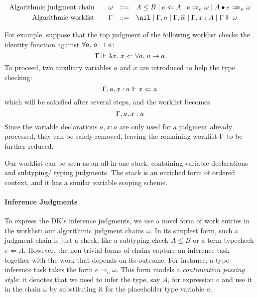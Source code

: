 $$\begin{aligned}
\text{Algorithmic judgment chain}\qquad&\jg &::=&\quad A \le B \mid e\Lto A \mid e\To_{a} \jg \mid \appInfAlg{A}{e}\\
\text{Algorithmic worklist}\qquad&\Gm &::=&\quad \nil \mid \Gm, a \mid \Gm, \al \mid \Gm, x: A \mid \Gm \Vdash \jg\\
\end{aligned}$$

For example, suppose that the top judgment of the following worklist
checks the identity function against $\all a \to a$:
$$\Gm \Vdash \lam x \Lto \all a \to a$$
To proceed, two auxiliary variables $a$ and $x$ are introduced to help the type checking:
$$\Gamma, a, x:a \Vdash x \Leftarrow a$$
which will be satisfied after several steps, and the worklist becomes
$$\Gamma, a, x:a$$
Since the variable declarations $a, x:a$ are only used for a judgment already processed,
they can be safely removed, leaving the remaining worklist $\Gamma$ to be further reduced.

Our worklist can be seen as an all-in-one stack,
containing variable declarations and subtyping/ typing judgments.
The stack is an enriched form of ordered context,
and it has a similar variable scoping scheme.


\paragraph{Inference Judgments}
To express the DK's inference judgments, we use a novel form of work entries in
the worklist: our algorithmic judgment chains $\omega$. In its simplest form,
such a judgment chain is just a check, like a subtyping check $A \leq B$ or a
term typecheck $e \Leftarrow A$. 
However, the non-trivial forms of chains capture an
inference task together with the work that depends on its outcome. For
instance, a type inference task takes the form $e \Rightarrow_a \omega$.
This form models a \emph{continuation passing style}:
it
denotes that we need to infer the type, say $A$, for expression $e$ and use it
in the chain $\omega$ by substituting it for the placeholder type variable $a$.

